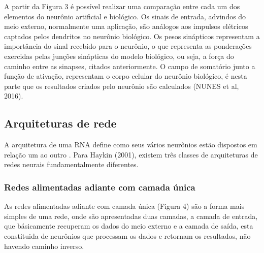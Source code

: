 

A partir da Figura 3 é possível realizar uma comparação entre cada um dos elementos do neurônio artificial e biológico. Os sinais de entrada, advindos do meio externo, normalmente uma aplicação, são análogos aos impulsos elétricos captados pelos dendritos no neurônio biológico.  Os pesos sinápticos representam a importância do sinal recebido para o neurônio, o que representa as ponderações exercidas pelas junções sinápticas do modelo biológico, ou seja, a força do caminho entre as sinapses, citados anteriormente. O campo de somatório junto a função de ativação, representam o corpo celular do neurônio biológico, é nesta parte que os resultados criados pelo neurônio são calculados (NUNES et al, 2016).

\subsection{Arquiteturas de rede} %

A arquitetura de uma RNA define como seus vários neurônios estão dispostos em relação um ao outro \cite{DaSilva2016}. Para Haykin (2001), existem três classes de arquiteturas de redes neurais fundamentalmente diferentes.

\subsubsection{Redes alimentadas adiante com camada única}

As redes alimentadas adiante com camada única (Figura 4) são a forma mais simples de uma rede, onde são apresentadas duas camadas, a camada de entrada, que básicamente recuperam os dados do meio externo e a camada de saída, esta constituida de neurônios que processam os dados e retornam os resultados, não havendo caminho inverso. 


